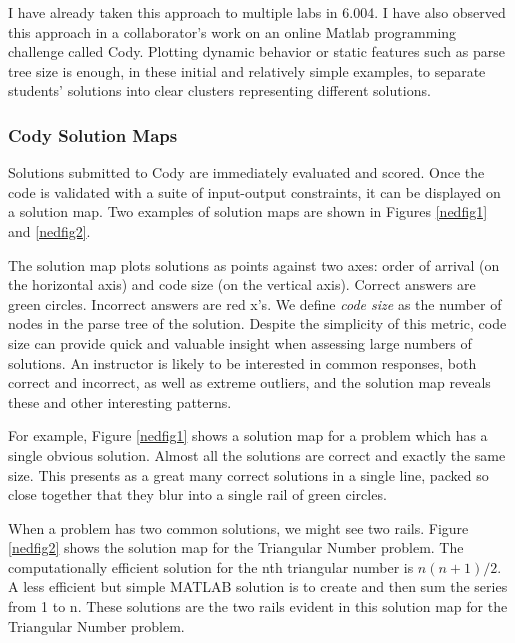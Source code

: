 \documentclass[12pt]{article}
\begin{document}
I have already taken this approach to multiple labs in 6.004. I have also observed this approach in a collaborator's work on an online Matlab programming challenge called Cody. Plotting dynamic behavior or static features such as parse tree size is enough, in these initial and relatively simple examples, to separate students' solutions into clear clusters representing different solutions. %

\subsubsection{Cody Solution Maps}
Solutions submitted to Cody are immediately evaluated and scored. Once the code is validated with a suite of input-output constraints, it can be displayed on a solution map. Two examples of solution maps are shown in Figures \ref{nedfig1} and \ref{nedfig2}. 
 
The solution map plots solutions as points against two axes: order of arrival (on the horizontal axis) and code size (on the vertical axis). Correct answers are green circles. Incorrect answers are red x's. We define \textit{code size} as the number of nodes in the parse tree of the solution. Despite the simplicity of this metric, code size can provide quick and valuable insight when assessing large numbers of solutions. An instructor is likely to be interested in common responses, both correct and incorrect, as well as extreme outliers, and the solution map reveals these and other interesting patterns.
 
For example, Figure \ref{nedfig1} shows a solution map for a problem which has a single obvious solution. Almost all the solutions are correct and exactly the same size. This presents as a great many correct solutions in a single line, packed so close together that they blur into a single rail of green circles.

When a problem has two common solutions, we might see two rails. Figure \ref{nedfig2} shows the solution map for the Triangular Number problem. The computationally efficient solution for the nth triangular number is $n(n+1)/2$. A less efficient but simple MATLAB solution is to create and then sum the series from 1 to n. These solutions are the two rails evident in this solution map for the Triangular Number problem.
\end{document}
